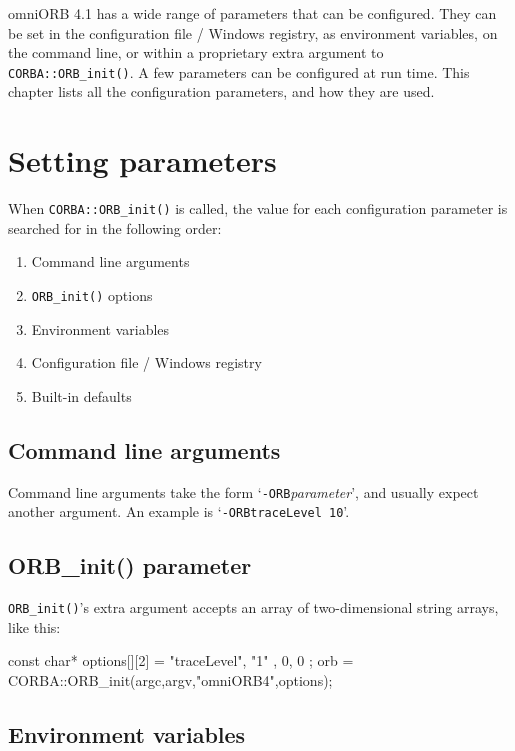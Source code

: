 \documentclass[11pt,twoside,a4paper]{book}
\newcommand{\op}[1]{\texttt{#1()}}
\newcommand{\cmdline}[1]{\texttt{#1}}
\begin{document}
omniORB 4.1 has a wide range of parameters that can be
configured. They can be set in the configuration file / Windows
registry, as environment variables, on the command line, or within a
proprietary extra argument to \op{CORBA::ORB\_init}. A few parameters
can be configured at run time. This chapter lists all the
configuration parameters, and how they are used.

\section{Setting parameters}

When \op{CORBA::ORB\_init} is called, the value for each configuration
parameter is searched for in the following order:

\begin{enumerate}

\item Command line arguments
\item \op{ORB\_init} options
\item Environment variables
\item Configuration file / Windows registry
\item Built-in defaults

\end{enumerate}

\subsection{Command line arguments}

Command line arguments take the form
`\cmdline{-ORB}\textit{parameter}', and usually expect another
argument. An example is `\cmdline{-ORBtraceLevel 10}'.


\subsection{ORB\_init() parameter}

\op{ORB\_init}'s extra argument accepts an array of two-dimensional
string arrays, like this:

\begin{cxxlisting}
const char* options[][2] = { { "traceLevel", "1" }, { 0, 0 } }; 
orb = CORBA::ORB_init(argc,argv,"omniORB4",options); 
\end{cxxlisting}


\subsection{Environment variables}
\end{document}
